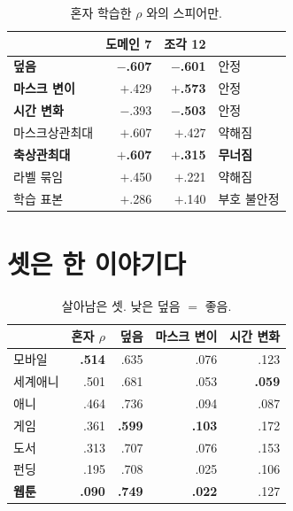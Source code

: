 \documentclass[10pt]{article}
\begin{document}
\begin{table}[t]
\centering\tsize
\caption{혼자 학습한 $\rho$ 와의 스피어만.}
\begin{tabular}{lrrl}
\toprule
& 도메인 7 & 조각 12 & \\
\midrule
\textbf{덮음} & \textbf{$-$.607} & \textbf{$-$.601} & 안정 \\
\textbf{마스크 변이} & $+$.429 & \textbf{$+$.573} & 안정 \\
\textbf{시간 변화} & $-$.393 & \textbf{$-$.503} & 안정 \\
\midrule
마스크상관최대 & $+$.607 & $+$.427 & 약해짐 \\
\textbf{축상관최대} & \textbf{$+$.607} & \textbf{$+$.315} & \textbf{무너짐} \\
라벨 묶임 & $+$.450 & $+$.221 & 약해짐 \\
학습 표본 & $+$.286 & $+$.140 & 부호 불안정 \\
\bottomrule
\end{tabular}
\end{table}



\section{셋은 한 이야기다}

\begin{table}[t]
\centering\tsize
\caption{살아남은 셋. 낮은 덮음 $=$ 좋음.}
\begin{tabular}{lrrrr}
\toprule
& 혼자 $\rho$ & 덮음 & 마스크 변이 & 시간 변화 \\
\midrule
모바일 & \textbf{.514} & .635 & .076 & .123 \\
세계애니 & .501 & .681 & .053 & \textbf{.059} \\
애니 & .464 & .736 & .094 & .087 \\
게임 & .361 & \textbf{.599} & \textbf{.103} & .172 \\
도서 & .313 & .707 & .076 & .153 \\
펀딩 & .195 & .708 & .025 & .106 \\
\textbf{웹툰} & \textbf{.090} & \textbf{.749} & \textbf{.022} & .127 \\
\bottomrule
\end{tabular}
\end{table}
\end{document}
